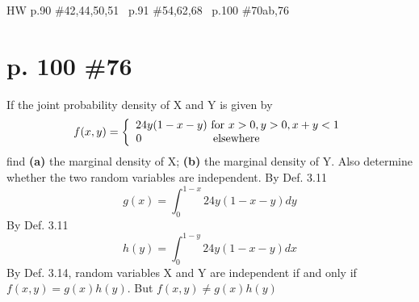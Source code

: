 \documentclass[12pt]{article}
\begin{document}
 \newline \newline

\newpage
\maketitle HW p.90 \#42,44,50,51 \ p.91 \#54,62,68 \ p.100 \#70ab,76
\section[20pt]{p. 100 \#76}
If the joint probability density of X and Y is given by
\[f(x,y)=\left\{\begin{array}{ccc}
24y(1-x-y) \textup{ for }x>0,y>0,x+y<1\\0 \ \ \ \ \ \ \ \ \ \ \ \ \ \ \ \ \ \ \ \textup{elsewhere}\ \ \ \ \ \ \ \ \ \ \ \ \ \ \ \ \ \ \ \ \
\end{array}\right.\]
find \newline
\textbf{(a)} the marginal density of X; \newline
\textbf{(b)} the marginal density of Y. \newline
Also determine whether the two random variables are independent. \newline \newline
By Def. 3.11
\[g(x)=\int_0^{1-x}24y(1-x-y)dy\]
\newline
\newline
By Def. 3.11
\[h(y)=\int_0^{1-y}24y(1-x-y)dx\]
 \newline \newline
By Def. 3.14, random variables X and Y are independent if and only if \(f(x,y)=g(x)h(y)\). \newline \newline
But \(f(x,y)\neq g(x)h(y)\) \newline
{}
\end{document}
